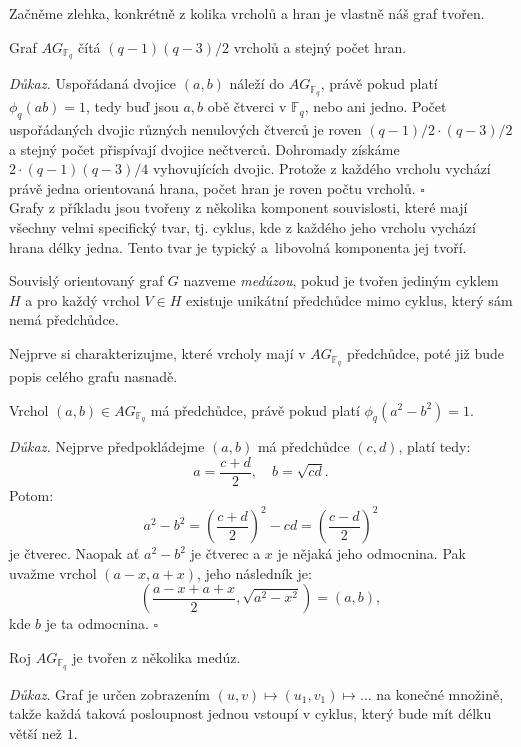 \documentclass[12pt]{report}
\begin{document}
Začněme zlehka, konkrétně z kolika vrcholů a hran je vlastně náš graf tvořen.

\begin{veta}\label{pocetprvkuAG}
Graf $AG_{\mathbb{F}_q}$ čítá $(q-1)(q-3)/2$ vrcholů a stejný počet hran.
\end{veta}
\noindent \textit{Důkaz.} Uspořádaná dvojice $(a,b)$ náleží do $AG_{\mathbb{F}_q}$, právě pokud platí $\phi_q(ab) = 1$, tedy buď jsou $a,b$ obě čtverci v $\mathbb{F}_q$, nebo ani jedno. Počet uspořádaných dvojic různých nenulových čtverců je roven $(q-1)/2 \cdot (q-3)/2$ a stejný počet přispívají dvojice nečtverců. Dohromady získáme $2 \cdot (q-1)(q-3)/4$ vyhovujících dvojic. Protože z každého vrcholu vychází právě jedna orientovaná hrana, počet hran je roven počtu vrcholů. \hfill $\square$\\

Grafy z příkladu jsou tvořeny z několika komponent souvislosti, které mají všechny velmi specifický tvar, tj. cyklus, kde z každého jeho vrcholu vychází hrana délky jedna. Tento tvar je typický a~libovolná komponenta jej tvoří.

\begin{definice}
Souvislý orientovaný graf $G$ nazveme \textit{medúzou}, pokud je tvořen jediným cyklem $H$ a pro každý vrchol $V \in H$ existuje unikátní předchůdce mimo cyklus, který sám nemá předchůdce.
\end{definice}

Nejprve si charakterizujme, které vrcholy mají v $AG_{\mathbb{F}_q}$ předchůdce, poté již bude popis celého grafu nasnadě.

\begin{lemma}
Vrchol $(a,b) \in AG_{\mathbb{F}_q}$ má předchůdce, právě pokud platí $\phi_q(a^2-b^2)=1$.
\end{lemma}

\noindent \textit{Důkaz.} Nejprve předpokládejme $(a,b)$ má předchůdce $(c,d)$, platí tedy:
\begin{equation*}
a = \frac{c+d}{2}, \quad b = \sqrt{cd}.
\end{equation*}
Potom:
\begin{equation*}
a^2 - b^2 = \left(\frac{c+d}{2} \right)^2 - cd = \left( \frac{c-d}{2} \right)^2
\end{equation*}
je čtverec. Naopak ať $a^2-b^2$ je čtverec a $x$ je nějaká jeho odmocnina. Pak uvažme vrchol $(a-x,a+x)$, jeho následník je: $$\left(\frac{a-x+a+x}{2}, \sqrt{a^2-x^2} \right)= \left(a, b \right),$$
kde $b$ je ta  odmocnina. \hfill $\square$
\begin{veta}\label{meduzy}
Roj $AG_{\mathbb{F}_q}$ je tvořen z několika medúz.
\end{veta}
\noindent \textit{Důkaz}. Graf je určen zobrazením $(u,v) \longmapsto (u_1,v_1) \longmapsto \dots$ na konečné množině, takže každá taková posloupnost jednou vstoupí v cyklus, který bude mít délku větší než $1$. 
\end{document}
